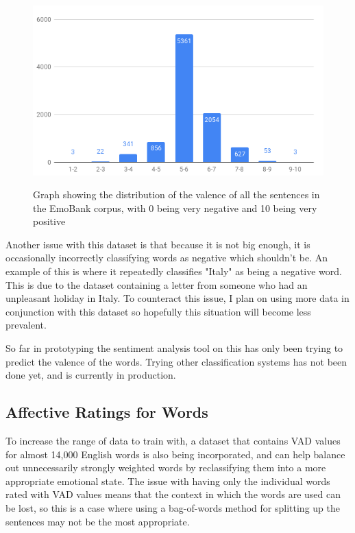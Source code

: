\begin{figure}[h]
\caption{Graph showing the distribution of the valence of all the sentences in the EmoBank corpus, with 0 being very negative and 10 being very positive}
\centering
\includegraphics[scale=1.8]{./LitReview/images/valence-frequency-bucket-graph.png}
\label{emoBank:dist}
\end{figure}

Another issue with this dataset is that because it is not big enough, it is occasionally incorrectly classifying words as negative which shouldn't be. An example of this is where it repeatedly classifies "Italy" as being a negative word. This is due to the dataset containing a letter from someone who had an unpleasant holiday in Italy. To counteract this issue, I plan on using more data in conjunction with this dataset so hopefully this situation will become less prevalent.

So far in prototyping the sentiment analysis tool on this has only been trying to predict the valence of the words. Trying other classification systems has not been done yet, and is currently in production. 

\pagebreak

\subsection{Affective Ratings for Words}
To increase the range of data to train with, a dataset that contains VAD values for almost 14,000 English words\cite{wordsData} is also being incorporated, and can help balance out unnecessarily strongly weighted words by reclassifying them into a more appropriate emotional state. The issue with having only the individual words rated with VAD values means that the context in which the words are used can be lost, so this is a case where using a bag-of-words method for splitting up the sentences may not be the most appropriate.

